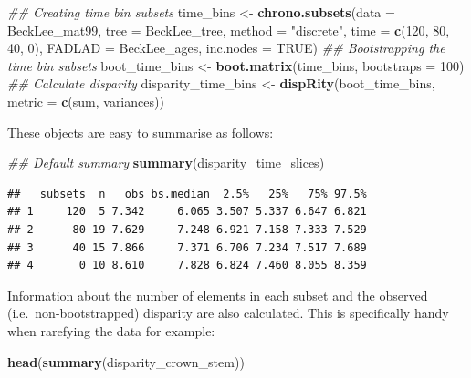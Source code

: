 \documentclass[]{book}
\newenvironment{Shaded}{\begin{snugshade}}{\end{snugshade}}
\newcommand{\CommentTok}[1]{\textcolor[rgb]{0.56,0.35,0.01}{\textit{#1}}}
\newcommand{\DataTypeTok}[1]{\textcolor[rgb]{0.13,0.29,0.53}{#1}}
\newcommand{\DecValTok}[1]{\textcolor[rgb]{0.00,0.00,0.81}{#1}}
\newcommand{\KeywordTok}[1]{\textcolor[rgb]{0.13,0.29,0.53}{\textbf{#1}}}
\newcommand{\NormalTok}[1]{#1}
\newcommand{\OtherTok}[1]{\textcolor[rgb]{0.56,0.35,0.01}{#1}}
\newcommand{\StringTok}[1]{\textcolor[rgb]{0.31,0.60,0.02}{#1}}
\begin{document}
\begin{Shaded}
\begin{Highlighting}[]
\CommentTok{## Creating time bin subsets}
\NormalTok{time_bins <-}\StringTok{ }\KeywordTok{chrono.subsets}\NormalTok{(}\DataTypeTok{data =}\NormalTok{ BeckLee_mat99,}
                            \DataTypeTok{tree =}\NormalTok{ BeckLee_tree, }
                            \DataTypeTok{method =} \StringTok{"discrete"}\NormalTok{,}
                            \DataTypeTok{time =} \KeywordTok{c}\NormalTok{(}\DecValTok{120}\NormalTok{, }\DecValTok{80}\NormalTok{, }\DecValTok{40}\NormalTok{, }\DecValTok{0}\NormalTok{),}
                            \DataTypeTok{FADLAD =}\NormalTok{ BeckLee_ages,}
                            \DataTypeTok{inc.nodes =} \OtherTok{TRUE}\NormalTok{)}
\CommentTok{## Bootstrapping the time bin subsets}
\NormalTok{boot_time_bins <-}\StringTok{ }\KeywordTok{boot.matrix}\NormalTok{(time_bins, }\DataTypeTok{bootstraps =} \DecValTok{100}\NormalTok{)}
\CommentTok{## Calculate disparity}
\NormalTok{disparity_time_bins <-}\StringTok{ }\KeywordTok{dispRity}\NormalTok{(boot_time_bins,}
                                \DataTypeTok{metric =} \KeywordTok{c}\NormalTok{(sum, variances))}
\end{Highlighting}
\end{Shaded}

These objects are easy to summarise as follows:

\begin{Shaded}
\begin{Highlighting}[]
\CommentTok{## Default summary}
\KeywordTok{summary}\NormalTok{(disparity_time_slices)}
\end{Highlighting}
\end{Shaded}

\begin{verbatim}
##   subsets  n   obs bs.median  2.5%   25%   75% 97.5%
## 1     120  5 7.342     6.065 3.507 5.337 6.647 6.821
## 2      80 19 7.629     7.248 6.921 7.158 7.333 7.529
## 3      40 15 7.866     7.371 6.706 7.234 7.517 7.689
## 4       0 10 8.610     7.828 6.824 7.460 8.055 8.359
\end{verbatim}

Information about the number of elements in each subset and the observed (i.e.~non-bootstrapped) disparity are also calculated.
This is specifically handy when rarefying the data for example:

\begin{Shaded}
\begin{Highlighting}[]
\KeywordTok{head}\NormalTok{(}\KeywordTok{summary}\NormalTok{(disparity_crown_stem))}
\end{Highlighting}
\end{Shaded}
\end{document}
